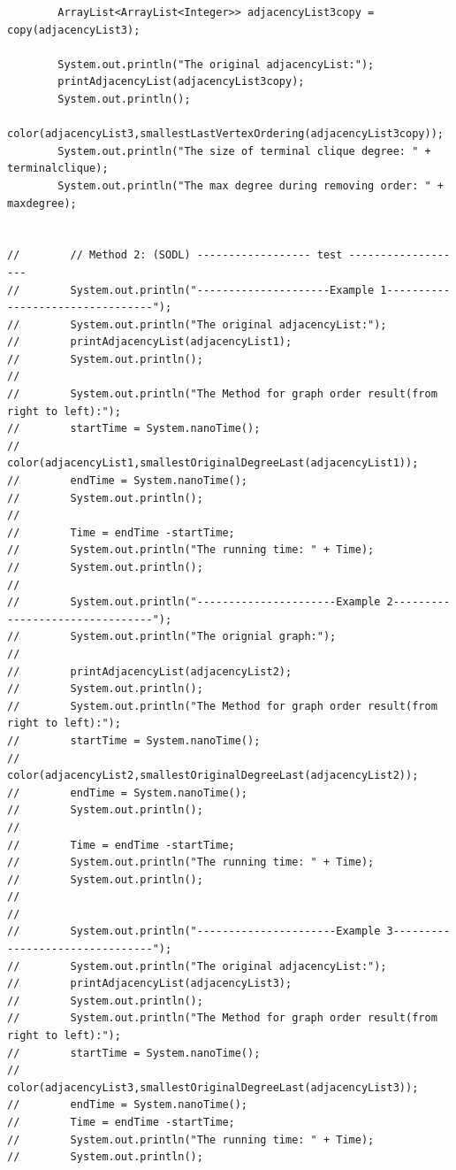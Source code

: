 \documentclass{article}
\begin{document}
\begin{verbatim}
        ArrayList<ArrayList<Integer>> adjacencyList3copy = copy(adjacencyList3);

        System.out.println("The original adjacencyList:");
        printAdjacencyList(adjacencyList3copy);
        System.out.println();
        color(adjacencyList3,smallestLastVertexOrdering(adjacencyList3copy));
        System.out.println("The size of terminal clique degree: " + terminalclique);
        System.out.println("The max degree during removing order: " + maxdegree);


//        // Method 2: (SODL) ------------------ test -------------------
//        System.out.println("---------------------Example 1---------------------------------");
//        System.out.println("The original adjacencyList:");
//        printAdjacencyList(adjacencyList1);
//        System.out.println();
//
//        System.out.println("The Method for graph order result(from right to left):");
//        startTime = System.nanoTime();
//        color(adjacencyList1,smallestOriginalDegreeLast(adjacencyList1));
//        endTime = System.nanoTime();
//        System.out.println();
//
//        Time = endTime -startTime;
//        System.out.println("The running time: " + Time);
//        System.out.println();
//
//        System.out.println("----------------------Example 2--------------------------------");
//        System.out.println("The orignial graph:");
//
//        printAdjacencyList(adjacencyList2);
//        System.out.println();
//        System.out.println("The Method for graph order result(from right to left):");
//        startTime = System.nanoTime();
//        color(adjacencyList2,smallestOriginalDegreeLast(adjacencyList2));
//        endTime = System.nanoTime();
//        System.out.println();
//
//        Time = endTime -startTime;
//        System.out.println("The running time: " + Time);
//        System.out.println();
//
//
//        System.out.println("----------------------Example 3--------------------------------");
//        System.out.println("The original adjacencyList:");
//        printAdjacencyList(adjacencyList3);
//        System.out.println();
//        System.out.println("The Method for graph order result(from right to left):");
//        startTime = System.nanoTime();
//        color(adjacencyList3,smallestOriginalDegreeLast(adjacencyList3));
//        endTime = System.nanoTime();
//        Time = endTime -startTime;
//        System.out.println("The running time: " + Time);
//        System.out.println();



\end{verbatim}
\end{document}
